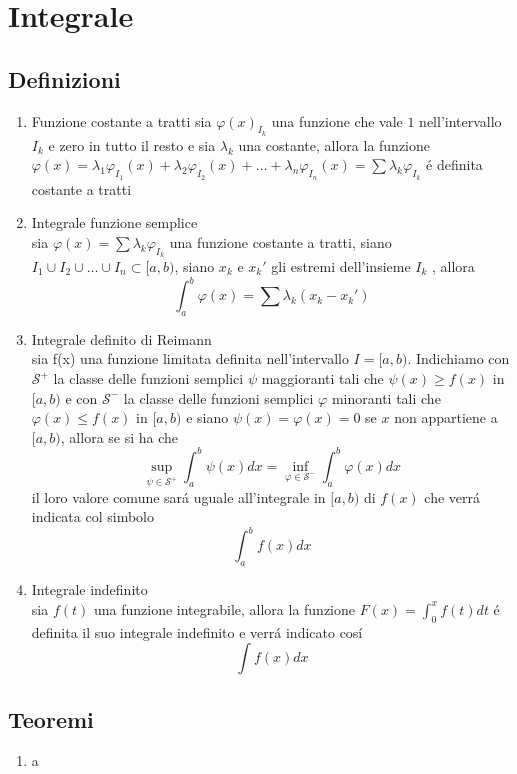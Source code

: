 \documentclass{exam}
\begin{document}
\section{Integrale}
	\subsection{Definizioni}
		\begin{enumerate}
			\item{Funzione costante a tratti}
				sia $\varphi(x)_{I_{k}}$ una funzione che vale $1$ nell'intervallo $I_{k}$ e zero in tutto il resto e sia $\lambda_{k}$ una costante, allora la funzione $\varphi(x)=\lambda_{1}\varphi_{I_{1}}(x)+\lambda_{2}\varphi_{I_{2}}(x)+\dots+\lambda_{n}\varphi_{I_{n}}(x)=\sum\lambda_{k}\varphi_{I_{k}}$ \'e definita costante a tratti
			\item{Integrale funzione semplice}\\
				sia $\varphi(x)=\sum\lambda_{k}\varphi_{I_{k}}$ una funzione costante a tratti, siano $I_1 \cup I_2 \cup \dots \cup I_n \subset [a,b)$,  siano $x_{k}$ e $x_{k}'$ gli estremi dell'insieme $I_{k}$ , allora 
				\begin{equation}
					\int_a^b \varphi(x)=\sum \lambda_{k}(x_{k}-x_{k}')
				\end{equation}
			\item{Integrale definito di Reimann}\\
				sia f(x) una funzione limitata definita nell'intervallo $I=[a,b)$. Indichiamo con $\mathscr{S}^+$ la classe delle funzioni semplici $\psi$ maggioranti tali che $\psi(x)\geq f(x)$ in $[a,b)$ e con $\mathscr{S}^-$ la classe delle funzioni semplici $\varphi$ minoranti tali che $\varphi(x)\le f(x)$ in $[a,b)$ e siano $\psi(x)=\varphi(x)=0$ se $x$ non appartiene a $[a,b)$, allora se si ha che 
				\begin{equation}
					\sup_{\psi\in\mathscr{S}^+}\int_a^b \psi(x)dx=\inf_{\varphi\in\mathscr{S}^-}\int_a^b \varphi(x)dx
				\end{equation}
				il loro valore comune sar\'a uguale all'integrale in $[a,b)$ di $f(x)$ che verr\'a indicata col simbolo
				\begin{equation}
					\int_a^b f(x)dx
				\end{equation}
			\item{Integrale indefinito}\\
				sia $f(t)$ una funzione integrabile, allora la funzione \(\displaystyle F(x)=\int_0^x f(t)dt\) \'e definita il suo integrale indefinito e verr\'a indicato cos\'i
				\begin{equation}
					\int f(x)dx
				\end{equation}
		\end{enumerate}
			




	\subsection{Teoremi}
		\begin{enumerate}
			\item
				a
		\end{enumerate}
\end{document}
